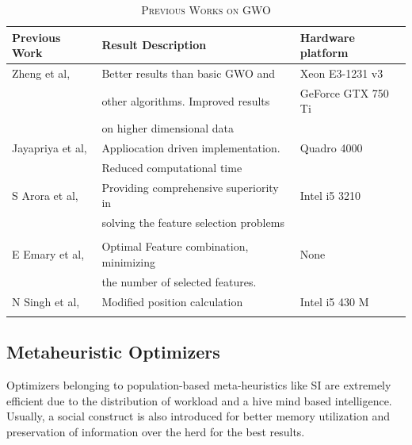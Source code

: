 \documentclass[conference]{IEEEtran}
\begin{document}
\begin{table}[!t]
\caption{\textsc{Previous Works on GWO}}
\label{table:pgwo}
\centering
\scalebox{0.8}
{
\begin{tabular}{| l | l | l |}
\hline
{Previous Work} & {Result Description} & {Hardware platform}\\
\hline
{Zheng et al,\cite{wang}} & {Better results than basic GWO and} & {Xeon E3-1231 v3}\\
{}&{other algorithms. Improved results}&{GeForce GTX 750 Ti}\\
{}&{on higher dimensional data}&{}\\
\hline
{Jayapriya et al,\cite{jp}} & {Appliocation driven implementation.} & {Quadro 4000}\\
{}&{Reduced computational time}&{}\\
\hline
{S Arora et al,\cite{arora}} & {Providing comprehensive superiority in} & {Intel i5 3210}\\
{}&{solving the feature selection problems}&{}\\
{}&{}&{}\\
\hline
{E Emary et al,\cite{emary}} & {Optimal Feature combination, minimizing} & {None}\\
{}&{the number of selected features.}&{}\\
\hline
{N Singh et al,\cite{singh}} & {Modified position calculation} & {Intel i5 430 M}\\
{}&{}&{}\\
\hline
\end{tabular}
}
\end{table}





\subsection{Metaheuristic Optimizers}
Optimizers belonging to population-based meta-heuristics like SI are extremely efficient due to the distribution of workload and a hive mind based intelligence. Usually, a social construct is also introduced for better memory utilization and preservation of information over the herd for the best results. 

% 
\end{document}
